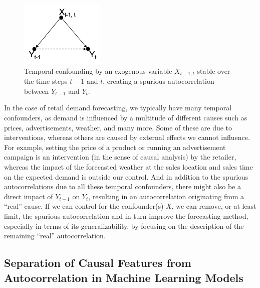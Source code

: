 \documentclass[BCOR=1mm, DIV=calc,10pt,
twoside=true,
twocolumn,
headings=normal]{scrartcl}
\begin{document}
\begin{figure}
\begin{center}
\includegraphics[width=4cm]{figs/temporal_confounding}
\caption{\label{fig:temporal_confounding} Temporal confounding by an exogenous variable $X_{t-1, t}$ stable over the time steps $t-1$ and $t$, creating a spurious autocorrelation between $Y_{t-1}$ and $Y_t$.}
\end{center}
\end{figure}

In the case of retail demand forecasting, we typically have many temporal confounders, as demand is influenced by a multitude of different causes such as prices, advertisements, weather, and many more. Some of these are due to interventions, whereas others are caused by external effects we cannot influence. For example, setting the price of a product or running an advertisement campaign is an intervention (in the sense of causal analysis) by the retailer, whereas the impact of the forecasted weather at the sales location and sales time on the expected demand is outside our control. And in addition to the spurious autocorrelations due to all these temporal confounders, there might also be a direct impact of $Y_{t-1}$ on $Y_t$, resulting in an autocorrelation originating from a ``real'' cause. If we can control for the confounder(s) $X$, we can remove, or at least limit, the spurious autocorrelation and in turn improve the forecasting method, especially in terms of its generalizability, by focusing on the description of the remaining ``real'' autocorrelation.

\subsection{Separation of Causal Features from Autocorrelation in Machine Learning Models}
\end{document}
